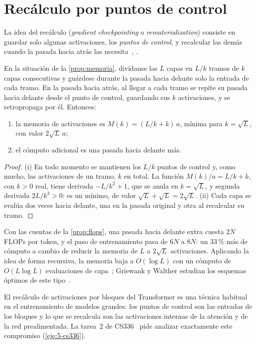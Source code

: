 \section{Recálculo por puntos de control}

La idea del recálculo (\emph{gradient checkpointing} o \emph{rematerialization}) consiste en guardar solo algunas activaciones, los \emph{puntos de control}, y recalcular las demás cuando la pasada hacia atrás las necesita~\cite{chen}, \cite[cap.~12]{gw}.

\begin{proposicion}\label{prop:checkpoint}
En la situación de la \cref{prop:memoria}, divídanse las $L$ capas en $L/k$ tramos de $k$ capas consecutivas y guárdese durante la pasada hacia delante solo la entrada de cada tramo. En la pasada hacia atrás, al llegar a cada tramo se repite su pasada hacia delante desde el punto de control, guardando sus $k$ activaciones, y se retropropaga por él. Entonces:
\begin{enumerate}
  \item la memoria de activaciones es $M(k)=(L/k+k)\,a$, mínima para $k=\sqrt L$, con valor $2\sqrt L\,a$;
  \item el cómputo adicional es una pasada hacia delante más.
\end{enumerate}
\end{proposicion}

\begin{proof}
(i) En todo momento se mantienen los $L/k$ puntos de control y, como mucho, las activaciones de un tramo, $k$ en total. La función $M(k)/a=L/k+k$, con $k>0$ real, tiene derivada $-L/k^{2}+1$, que se anula en $k=\sqrt L$, y segunda derivada $2L/k^{3}>0$: es un mínimo, de valor $\sqrt L+\sqrt L=2\sqrt L$. (ii) Cada capa se evalúa dos veces hacia delante, una en la pasada original y otra al recalcular su tramo.
\end{proof}

Con las cuentas de la \cref{prop:flops}, una pasada hacia delante extra cuesta $2N$ FLOPs por token, y el paso de entrenamiento pasa de $6N$ a $8N$: un 33\,\% más de cómputo a cambio de reducir la memoria de $L$ a $2\sqrt L$ activaciones. Aplicando la idea de forma recursiva, la memoria baja a $O(\log L)$ con un cómputo de $O(L\log L)$ evaluaciones de capa~\cite{chen}; Griewank y Walther estudian los esquemas óptimos de este tipo~\cite[cap.~12]{gw}.

\begin{observacion}
El recálculo de activaciones por bloques del Transformer es una técnica habitual en el entrenamiento de modelos grandes: los puntos de control son las entradas de los bloques y lo que se recalcula son las activaciones internas de la atención y de la red prealimentada. La tarea~2 de CS336~\cite{cs336a2} pide analizar exactamente este compromiso (\cref{eje:5-cs336}).
\end{observacion}

